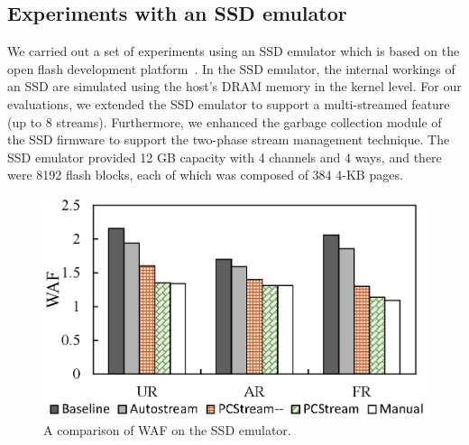 \subsection{Experiments with an SSD emulator}

We carried out a set of experiments using an SSD emulator which is based on the
open flash development platform~\cite{AMF}.  
In the SSD emulator, the internal workings of an SSD are simulated using the host's DRAM memory in the kernel level. 
For our evaluations, we extended the SSD emulator to support a multi-streamed feature %
(up to 8 streams). %
Furthermore, we enhanced the garbage collection module of the SSD firmware to support the two-phase stream management technique. 
The SSD emulator provided 12 GB capacity with 4 channels and 4 ways, and there were 8192 flash blocks, each of which was composed of 384 4-KB pages.  

\begin{figure}[t]
	\centering
	\includegraphics[scale=0.6]{figure/pcstream_/result_emul}
	\caption{A comparison of WAF on the SSD emulator.}
	\label{fig:result_emul}
\end{figure}


